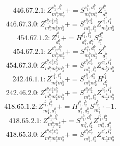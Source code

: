 \documentclass[letterpaper,10pt,fleqn,leqno,onecolumn]{article}
\begin{document}
\begin{equation} \;\;\;\;\;\;  446.67.2.1: Z^{e_{1}^{b},l_{1}^{b}}_{m_{1}^{b}m_{2}^{b}}+=S^{e_{1}^{b},d_{1}^{b}}_{m_{1}^{b}m_{2}^{b}}Z^{l_{1}^{b}}_{d_{1}^{b}} \end{equation}
\begin{equation} \;\;\;\;\;\;  446.67.3.0: Z^{e_{1}^{b}e_{2}^{b}e_{3}^{b}}_{m_{1}^{b}m_{2}^{b}m_{3}^{b}}+=S^{e_{1}^{b}e_{2}^{b}}_{m_{1}^{b},l_{1}^{b}}Z^{e_{3}^{b},l_{1}^{b}}_{m_{2}^{b}m_{3}^{b}} \end{equation}
\begin{equation} \;\;\;\;\;\;  454.67.1.2: Z^{l_{1}^{b}}_{d_{1}^{b}}+=H^{l_{1}^{b},l_{1}^{a}}_{d_{1}^{b},d_{1}^{a}}S^{d_{1}^{a}}_{l_{1}^{a}} \end{equation}
\begin{equation} \;\;\;\;\;\;  454.67.2.1: Z^{e_{1}^{b},l_{1}^{b}}_{m_{1}^{b}m_{2}^{b}}+=S^{e_{1}^{b},d_{1}^{b}}_{m_{1}^{b}m_{2}^{b}}Z^{l_{1}^{b}}_{d_{1}^{b}} \end{equation}
\begin{equation} \;\;\;\;\;\;  454.67.3.0: Z^{e_{1}^{b}e_{2}^{b}e_{3}^{b}}_{m_{1}^{b}m_{2}^{b}m_{3}^{b}}+=S^{e_{1}^{b}e_{2}^{b}}_{m_{1}^{b},l_{1}^{b}}Z^{e_{3}^{b},l_{1}^{b}}_{m_{2}^{b}m_{3}^{b}} \end{equation}
\begin{equation} \;\;\;\;\;\;  242.46.1.1: Z^{e_{1}^{b},l_{1}^{b}}_{m_{1}^{b}m_{2}^{b}}+=S^{e_{1}^{b},d_{1}^{b}}_{m_{1}^{b}m_{2}^{b}}H^{l_{1}^{b}}_{d_{1}^{b}} \end{equation}
\begin{equation} \;\;\;\;\;\;  242.46.2.0: Z^{e_{1}^{b}e_{2}^{b}e_{3}^{b}}_{m_{1}^{b}m_{2}^{b}m_{3}^{b}}+=S^{e_{1}^{b}e_{2}^{b}}_{m_{1}^{b},l_{1}^{b}}Z^{e_{3}^{b},l_{1}^{b}}_{m_{2}^{b}m_{3}^{b}} \end{equation}
\begin{equation} \;\;\;\;\;\;  418.65.1.2: Z^{l_{1}^{b},l_{2}^{b}}_{m_{1}^{b},d_{1}^{b}}+=H^{l_{1}^{b},l_{2}^{b}}_{d_{1}^{b},d_{2}^{b}}S^{d_{2}^{b}}_{m_{1}^{b}}\cdot -1. \end{equation}
\begin{equation} \;\;\;\;\;\;  418.65.2.1: Z^{e_{1}^{b},l_{1}^{b}}_{m_{1}^{b}m_{2}^{b}}+=S^{e_{1}^{b},d_{1}^{b}}_{m_{1}^{b},l_{2}^{b}}Z^{l_{1}^{b},l_{2}^{b}}_{m_{2}^{b},d_{1}^{b}} \end{equation}
\begin{equation} \;\;\;\;\;\;  418.65.3.0: Z^{e_{1}^{b}e_{2}^{b}e_{3}^{b}}_{m_{1}^{b}m_{2}^{b}m_{3}^{b}}+=S^{e_{1}^{b}e_{2}^{b}}_{m_{1}^{b},l_{1}^{b}}Z^{e_{3}^{b},l_{1}^{b}}_{m_{2}^{b}m_{3}^{b}} \end{equation}
\end{document}

